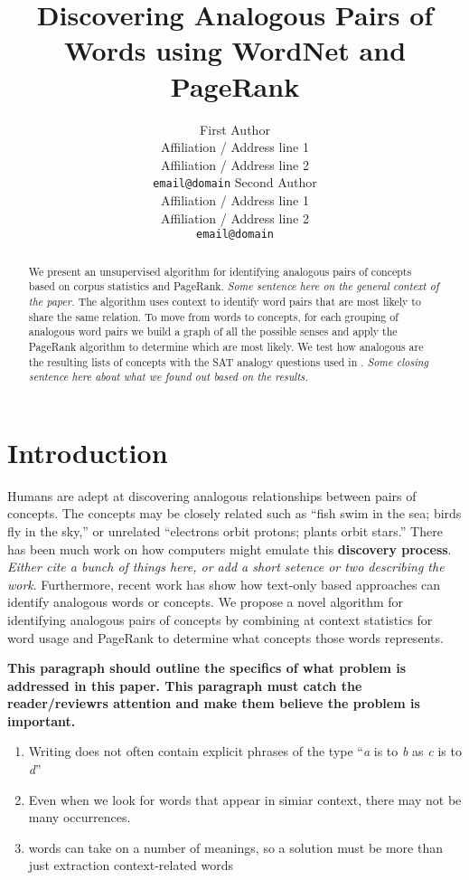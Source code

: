 \documentclass[11pt]{article}
\title{Discovering Analogous Pairs of Words using WordNet and PageRank}
\author{First Author\\
  Affiliation / Address line 1\\
  Affiliation / Address line 2\\
  {\tt email@domain}  \And
  Second Author\\
  Affiliation / Address line 1\\
  Affiliation / Address line 2\\
  {\tt  email@domain}}
\date{}
\begin{document}
\maketitle

\begin{abstract}

We present an unsupervised algorithm for identifying analogous pairs of concepts
based on corpus statistics and PageRank.  \emph{Some sentence here on the
  general context of the paper.} The algorithm uses context to identify word
pairs that are most likely to share the same relation.  To move from words to
concepts, for each grouping of analogous word pairs we build a graph of all the
possible senses and apply the PageRank algorithm to determine which are most
likely.  We test how analogous are the resulting lists of concepts with the SAT
analogy questions used in \cite{turney03combining}.  \emph{Some closing sentence
  here about what we found out based on the results.}


\end{abstract}

\section{Introduction}

Humans are adept at discovering analogous relationships between pairs of
concepts.  The concepts may be closely related such as ``fish swim in the sea;
birds fly in the sky,'' or unrelated ``electrons orbit protons; plants orbit
stars.''  There has been much work on how computers might emulate this {\bf
  discovery process}\cite{gentner83structure}.  \emph{Either cite a bunch of
  things here, or add a short setence or two describing the work}.  Furthermore,
recent work has show how text-only based approaches can identify analogous words
or concepts\cite{mangalath04analogy,turney05corpus,bicici06clustering}.  We
propose a novel algorithm for identifying analogous pairs of concepts by
combining at context statistics for word usage and PageRank\cite{brin98anatomy}
to determine what concepts those words represents.

{\bf This paragraph should outline the specifics of what problem is addressed in
  this paper.  This paragraph must catch the reader/reviewrs attention and make
  them believe the problem is important.}
\begin{enumerate}
  \item Writing does not often contain explicit phrases of the type ``\emph{a}
    is to \emph{b} as \emph{c} is to \emph{d}''
  \item Even when we look for words that appear in simiar context, there  may
    not be many occurrences.
  \item words can take on a number of meanings, so a solution must be more than
    just extraction context-related words
\end{enumerate}
\end{document}
